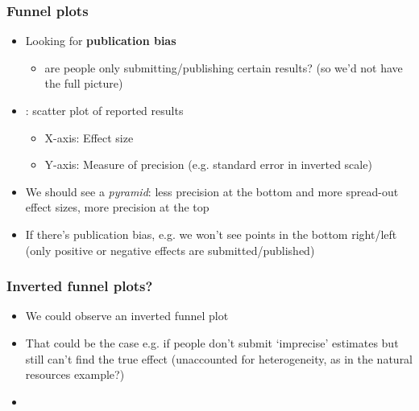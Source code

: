 \documentclass[aspectratio=43]{beamer}
\begin{document}
\begin{frame}
\frametitle{Funnel plots}
\centering

\begin{itemize}
  \item Looking for \textbf{publication bias}
  \begin{itemize}
    \item are people only submitting/publishing certain results? (so we'd not have the full picture)
  \end{itemize}
  \item<2-> : scatter plot of reported results
  \begin{itemize}
    \item X-axis: Effect size
    \item Y-axis: Measure of precision (e.g. standard error in inverted scale)
  \end{itemize}
  \item<3-> We should see a \textit{pyramid}: less precision at the bottom and more spread-out effect sizes, more precision at the top
  \item<4-> If there's publication bias, e.g. we won't see points in the bottom right/left (only positive or negative effects are submitted/published)
\end{itemize}

\end{frame}


  
\begin{frame}
\frametitle{Inverted funnel plots?}
\centering

\begin{itemize}
  \item We could observe an inverted funnel plot
  \item That could be the case e.g. if people don't submit `imprecise' estimates but still can't find the true effect (unaccounted for heterogeneity, as in the natural resources example?)
  \item
\end{itemize}

\end{frame}
  
\end{document}
